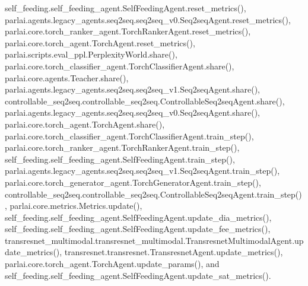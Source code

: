 self\+\_\+feeding.\+self\+\_\+feeding\+\_\+agent.\+Self\+Feeding\+Agent.\+reset\+\_\+metrics(), parlai.\+agents.\+legacy\+\_\+agents.\+seq2seq.\+seq2seq\+\_\+v0.\+Seq2seq\+Agent.\+reset\+\_\+metrics(), parlai.\+core.\+torch\+\_\+ranker\+\_\+agent.\+Torch\+Ranker\+Agent.\+reset\+\_\+metrics(), parlai.\+core.\+torch\+\_\+agent.\+Torch\+Agent.\+reset\+\_\+metrics(), parlai.\+scripts.\+eval\+\_\+ppl.\+Perplexity\+World.\+share(), parlai.\+core.\+torch\+\_\+classifier\+\_\+agent.\+Torch\+Classifier\+Agent.\+share(), parlai.\+core.\+agents.\+Teacher.\+share(), parlai.\+agents.\+legacy\+\_\+agents.\+seq2seq.\+seq2seq\+\_\+v1.\+Seq2seq\+Agent.\+share(), controllable\+\_\+seq2seq.\+controllable\+\_\+seq2seq.\+Controllable\+Seq2seq\+Agent.\+share(), parlai.\+agents.\+legacy\+\_\+agents.\+seq2seq.\+seq2seq\+\_\+v0.\+Seq2seq\+Agent.\+share(), parlai.\+core.\+torch\+\_\+agent.\+Torch\+Agent.\+share(), parlai.\+core.\+torch\+\_\+classifier\+\_\+agent.\+Torch\+Classifier\+Agent.\+train\+\_\+step(), parlai.\+core.\+torch\+\_\+ranker\+\_\+agent.\+Torch\+Ranker\+Agent.\+train\+\_\+step(), self\+\_\+feeding.\+self\+\_\+feeding\+\_\+agent.\+Self\+Feeding\+Agent.\+train\+\_\+step(), parlai.\+agents.\+legacy\+\_\+agents.\+seq2seq.\+seq2seq\+\_\+v1.\+Seq2seq\+Agent.\+train\+\_\+step(), parlai.\+core.\+torch\+\_\+generator\+\_\+agent.\+Torch\+Generator\+Agent.\+train\+\_\+step(), controllable\+\_\+seq2seq.\+controllable\+\_\+seq2seq.\+Controllable\+Seq2seq\+Agent.\+train\+\_\+step(), parlai.\+core.\+metrics.\+Metrics.\+update(), self\+\_\+feeding.\+self\+\_\+feeding\+\_\+agent.\+Self\+Feeding\+Agent.\+update\+\_\+dia\+\_\+metrics(), self\+\_\+feeding.\+self\+\_\+feeding\+\_\+agent.\+Self\+Feeding\+Agent.\+update\+\_\+fee\+\_\+metrics(), transresnet\+\_\+multimodal.\+transresnet\+\_\+multimodal.\+Transresnet\+Multimodal\+Agent.\+update\+\_\+metrics(), transresnet.\+transresnet.\+Transresnet\+Agent.\+update\+\_\+metrics(), parlai.\+core.\+torch\+\_\+agent.\+Torch\+Agent.\+update\+\_\+params(), and self\+\_\+feeding.\+self\+\_\+feeding\+\_\+agent.\+Self\+Feeding\+Agent.\+update\+\_\+sat\+\_\+metrics().

\mbox{\label{classparlai_1_1agents_1_1legacy__agents_1_1seq2seq_1_1seq2seq__v0_1_1Seq2seqAgent_ae6ef958bb58cc1597b23b0a6c6c49b3f}} 
